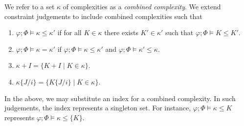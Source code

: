 \begin{definition}\label{def:combinedcomp} 
    We refer to a set $\kappa$ of complexities as a \textit{combined complexity}. We extend constraint judgements to include combined complexities such that
    \begin{enumerate}
        \item $\varphi;\Phi\vDash \kappa \leq \kappa'$ if for all $K \in \kappa$ there exists $K'\in \kappa'$ such that $\varphi;\Phi\vDash K \leq K'$.
        \item $\varphi;\Phi\vDash \kappa = \kappa'$ if $\varphi;\Phi\vDash \kappa \leq \kappa'$ and $\varphi;\Phi\vDash \kappa' \leq \kappa$.
        \item $\kappa + I = \{K + I \mid K \in \kappa\}$.
        \item $\kappa\{J/i\} = \{ K\{J/i\} \mid K\in\kappa \}$.
    \end{enumerate}
    In the above, we may substitute an index for a combined complexity. In such judgements, the index represents a singleton set. For instance, $\varphi;\Phi\vDash \kappa \leq K$ represents $\varphi;\Phi\vDash \kappa \leq \{K\}$.
\end{definition}

